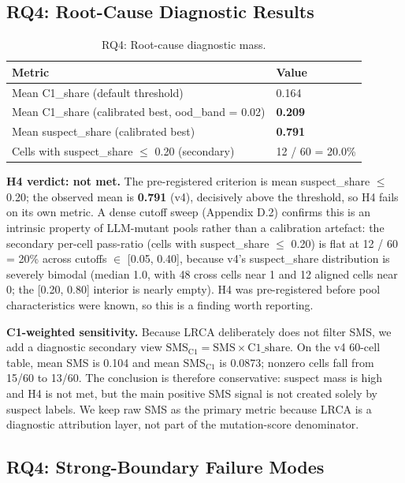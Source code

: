 \documentclass[12pt]{article}
\begin{document}
\subsection{RQ4: Root-Cause Diagnostic Results}\label{h5-lrca-mass}

\begin{table}[t]
\caption{RQ4: Root-cause diagnostic mass.}
\label{tab:p2-13}
\centering
\begin{tabular}{ll}
\toprule
Metric & Value \\
\midrule
Mean C1\_share (default threshold) & 0.164 \\
Mean C1\_share (calibrated best, ood\_band = 0.02) & \textbf{0.209} \\
Mean suspect\_share (calibrated best) & \textbf{0.791} \\
Cells with suspect\_share $\leq$ 0.20 (secondary) & 12 / 60 = 20.0\% \\
\bottomrule
\end{tabular}
\end{table}

\textbf{H4 verdict: not met.} The pre-registered criterion is mean
suspect\_share $\leq$ 0.20; the observed mean is \textbf{0.791} (v4),
decisively above the threshold, so H4 fails on its own metric. A dense
cutoff sweep (Appendix D.2) confirms this is an intrinsic property of
LLM-mutant pools rather than a calibration artefact: the secondary
per-cell pass-ratio (cells with suspect\_share $\leq$ 0.20) is flat at
12 / 60 = 20\% across cutoffs $\in$ {[}0.05, 0.40{]}, because v4's
suspect\_share distribution is severely bimodal (median 1.0, with 48
cross cells near 1 and 12 aligned cells near 0; the {[}0.20, 0.80{]}
interior is nearly empty). H4 was pre-registered before pool
characteristics were known, so this is a finding worth reporting.

\textbf{C1-weighted sensitivity.} Because LRCA deliberately does not
filter SMS, we add a diagnostic secondary view
$\mathrm{SMS}_{\mathrm{C1}} = \mathrm{SMS} \times \mathrm{C1\_share}$.
On the v4 60-cell table, mean SMS is 0.104 and mean
$\mathrm{SMS}_{\mathrm{C1}}$ is 0.0873; nonzero cells fall from 15/60 to
13/60. The conclusion is therefore conservative: suspect mass is high
and H4 is not met, but the main positive SMS signal is not created solely
by suspect labels. We keep raw SMS as the primary metric because LRCA is
a diagnostic attribution layer, not part of the mutation-score
denominator.

\subsection{RQ4: Strong-Boundary Failure Modes}\label{rq4-strong-boundary}
\end{document}
